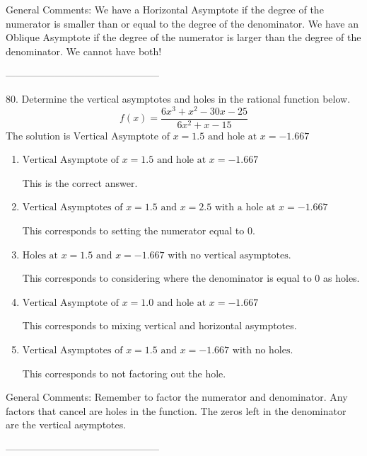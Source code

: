 \documentclass{extbook}[14pt]
\begin{document}
General Comments: We have a Horizontal Asymptote if the degree of the numerator is smaller than or equal to the degree of the denominator. We have an Oblique Asymptote if the degree of the numerator is larger than the degree of the denominator. We cannot have both!

-----------------------------------------------

80. Determine the vertical asymptotes and holes in the rational function below.
\[ f(x) = \frac{6x^{3} + x^{2} -30 x -25}{6x^{2} +x -15} \] 
The solution is $ \text{Vertical Asymptote of } x = 1.5 \text{ and hole at } x = -1.667 $ 

\begin{enumerate}[label=\Alph*.] 
\item $ \text{Vertical Asymptote of } x = 1.5 \text{ and hole at } x = -1.667 $ 

 This is the correct answer. 
\item $ \text{Vertical Asymptotes of } x = 1.5 \text{ and } x = 2.5 \text{ with a hole at } x = -1.667 $ 

 This corresponds to setting the numerator equal to 0. 
\item $ \text{Holes at } x = 1.5 \text{ and } x = -1.667 \text{ with no vertical asymptotes.} $ 

 This corresponds to considering where the denominator is equal to 0 as holes. 
\item $ \text{Vertical Asymptote of } x = 1.0 \text{ and hole at } x = -1.667 $ 

 This corresponds to mixing vertical and horizontal asymptotes. 
\item $ \text{Vertical Asymptotes of } x = 1.5 \text{ and } x = -1.667 \text{ with no holes.} $ 

 This corresponds to not factoring out the hole. 
\end{enumerate} 
 
General Comments: Remember to factor the numerator and denominator. Any factors that cancel are holes in the function. The zeros left in the denominator are the vertical asymptotes.

-----------------------------------------------
\end{document}
